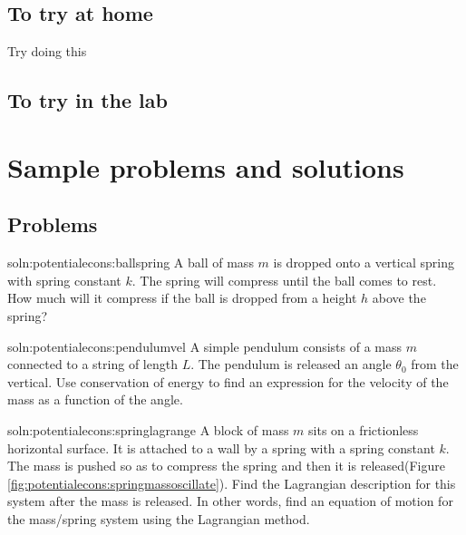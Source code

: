 \subsection{To try at home}

\begin{tQuestion}Try doing this \end{tQuestion}

\subsection{To try in the lab}

\newpage
\section{Sample problems and solutions}
\subsection{Problems}

\begin{problem}{soln:potentialecons:ballspring}{\label{prob:potentialecons:ballspring} A ball of mass $m$ is dropped onto a vertical spring with spring constant $k$. The spring will compress until the ball comes to rest. How much will it compress if the ball is dropped from a height $h$ above the spring?}
\end{problem}


\begin{problem}{soln:potentialecons:pendulumvel}{\label{prob:potentialecons:pendulumvel}
A simple pendulum consists of a mass $m$ connected to a string of length $L$. The pendulum is released an angle $\theta_0$ from the vertical. Use conservation of energy to find an expression for the velocity of the mass as a function of the angle.}
\end{problem}


\begin{problem}{soln:potentialecons:springlagrange}{ \label{prob:potentialecons:springlagrange} A block of mass $m$ sits on a frictionless horizontal surface. It is attached to a wall by a spring with a spring constant $k$. The mass is pushed so as to compress the spring and then it is released(Figure \ref{fig:potentialecons:springmassoscillate}). Find the Lagrangian description for this system after the mass is released. In other words, find an equation of motion for the mass/spring system using the Lagrangian method.}
\end{problem} 


